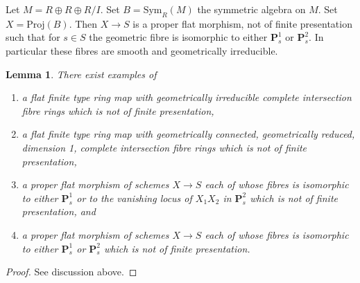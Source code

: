 \documentclass[10pt,a4paper]{amsart}
\theoremstyle{plain}
\newtheorem{lemma}[subsection]{Lemma}
\theoremstyle{definition}
\theoremstyle{remark}
\numberwithin{equation}{subsection}
\begin{document}
\medskip\noindent
Let $M = R \oplus R \oplus R/I$. Set $B = \text{Sym}_R(M)$ the
symmetric algebra on $M$. Set $X = \text{Proj}(B)$.
Then $X \to S$ is a proper flat morphism, not of finite presentation
such that for $s \in S$ the geometric fibre is isomorphic to either
$\mathbf{P}^1_s$ or $\mathbf{P}^2_s$. In particular these fibres are
smooth and geometrically irreducible.

\begin{lemma}
\label{lemma-finite-type-flat-not-finitely-presented}
There exist examples of
\begin{enumerate}
\item a flat finite type ring map with geometrically irreducible
complete intersection fibre rings which is not of finite presentation,
\item a flat finite type ring map with geometrically connected,
geometrically reduced, dimension 1, complete intersection fibre rings
which is not of finite presentation,
\item a proper flat morphism of schemes $X \to S$ each of whose fibres
is isomorphic to either $\mathbf{P}^1_s$ or to the vanishing locus of
$X_1X_2$ in $\mathbf{P}^2_s$ which is not of finite presentation, and
\item a proper flat morphism of schemes $X \to S$ each of whose
fibres is isomorphic to either $\mathbf{P}^1_s$ or $\mathbf{P}^2_s$
which is not of finite presentation.
\end{enumerate}
\end{lemma}

\begin{proof}
See discussion above.
\end{proof}
\end{document}
